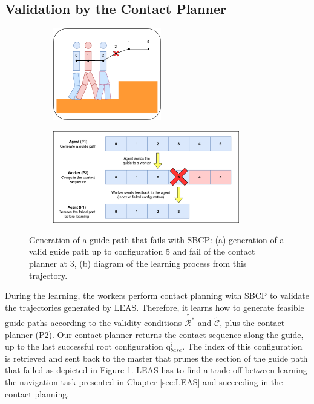 \subsection{Validation by the Contact Planner}
\begin{figure}[ht]
    \captionsetup[subfigure]{justification=centering}
    \centering
    \begin{subfigure}[t]{.35\linewidth}
    \includegraphics[width=\textwidth, height=4cm]{Figures/Chapter_CPSB/example_fail_planning.png}
    \caption{}
    \end{subfigure}
    \begin{subfigure}[t]{.60\linewidth}
    \includegraphics[width=\textwidth, height=4cm]{Figures/Chapter_CPSB/example_fail_planning_diagram.png}
    \caption{}
    \end{subfigure}
    \caption{Generation of a guide path that fails with SBCP: (a) generation of a valid guide path up to configuration 5 and fail of the contact planner at 3, (b) diagram of the learning process from this trajectory.}
    \label{fig:cp-sb:remove_fail_path}
\end{figure}
During the learning, the workers perform contact planning with SBCP to validate the trajectories generated by LEAS. Therefore, it learns how to generate feasible guide paths according to the validity conditions $\tilde{\mathcal{R}^*}$ and $\tilde{\mathcal{C}}$, plus the contact planner (P2).
Our contact planner returns the contact sequence along the guide, up to the last successful root configuration q$_{base}^i$.
The index of this configuration is retrieved and sent back to the master that prunes the section of the guide path that failed as depicted in Figure \ref{fig:cp-sb:remove_fail_path}.
LEAS has to find a trade-off between learning the navigation task presented in Chapter \ref{sec:LEAS} and succeeding in the contact planning.


